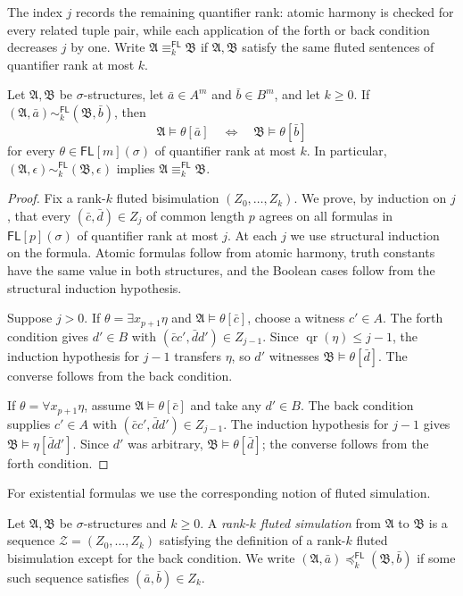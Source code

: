 \documentclass{lmcs}
\newcommand{\FL}{\mathsf{FL}}
\newcommand{\qr}{\operatorname{qr}}
\newcommand{\A}{\mathfrak{A}}
\newcommand{\B}{\mathfrak{B}}
\begin{document}
The index $j$ records the remaining quantifier rank: atomic harmony is checked
for every related tuple pair, while each application of the forth or back
condition decreases $j$ by one.  Write
$\A\equiv_k^{\FL}\B$ if $\A,\B$ satisfy the same fluted sentences of
quantifier rank at most $k$.

\begin{prop}
\label{prop:bisimulation-invariance}
Let $\A,\B$ be $\sigma$-structures, let $\bar a\in A^m$ and
$\bar b\in B^m$, and let $k\geq0$.  If
$(\A,\bar a)\sim_k^{\FL}(\B,\bar b)$, then
\[
  \A\models\theta[\bar a]
  \quad\Longleftrightarrow\quad
  \B\models\theta[\bar b]
\]
for every $\theta\in\FL[m](\sigma)$ of quantifier rank at most $k$.  In
particular,
$(\A,\epsilon)\sim_k^{\FL}(\B,\epsilon)$ implies
$\A\equiv_k^{\FL}\B$.
\end{prop}

\begin{proof}
Fix a rank-$k$ fluted bisimulation $(Z_0,\ldots,Z_k)$.  We prove, by induction
on $j$, that every $(\bar c,\bar d)\in Z_j$ of common length $p$ agrees on
all formulas in $\FL[p](\sigma)$ of quantifier rank at most $j$.  At each $j$
we use structural induction on the formula.  Atomic formulas follow from
atomic harmony, truth constants have the same value in both structures, and the Boolean cases
follow from the structural induction hypothesis.

Suppose $j>0$.  If $\theta=\exists x_{p+1}\eta$ and
$\A\models\theta[\bar c]$, choose a witness $c'\in A$.  The forth condition gives $d'\in B$
with $(\bar c c',\bar d d')\in Z_{j-1}$.  Since $\qr(\eta)\leq j-1$, the
induction hypothesis for $j-1$ transfers $\eta$, so $d'$ witnesses
$\B\models\theta[\bar d]$.  The converse follows from the back condition.

If $\theta=\forall x_{p+1}\eta$, assume
$\A\models\theta[\bar c]$ and take any $d'\in B$.  The back condition supplies $c'\in A$
with $(\bar c c',\bar d d')\in Z_{j-1}$.  The induction hypothesis for
$j-1$ gives $\B\models\eta[\bar d d']$.  Since $d'$ was arbitrary,
$\B\models\theta[\bar d]$; the converse follows from the forth condition.
\end{proof}

For existential formulas we use the corresponding notion of fluted simulation.

\begin{defi}\label{def:fluted-simulation}
Let $\A,\B$ be $\sigma$-structures and $k\geq0$.
A \emph{rank-$k$ fluted simulation} from $\A$ to $\B$ is a sequence
$\mathcal Z=(Z_0,\ldots,Z_k)$ satisfying the definition of a rank-$k$ fluted
bisimulation except for the back condition.  We write
$(\A,\bar a)\preccurlyeq_k^{\FL}(\B,\bar b)$ if some such sequence satisfies
$(\bar a,\bar b)\in Z_k$.
\end{defi}
\end{document}
